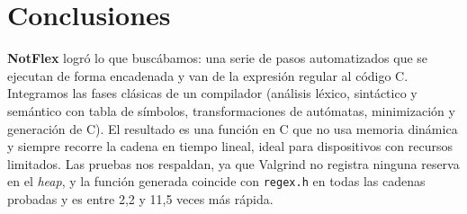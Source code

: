 \documentclass[runningheads]{llncs}
\begin{document}
\section{Conclusiones}
\textbf{NotFlex} logró lo que buscábamos: una serie de pasos automatizados que se ejecutan de forma encadenada y van de la expresión regular al código C. Integramos las fases clásicas de un compilador (análisis léxico, sintáctico y semántico con tabla de símbolos, transformaciones de autómatas, minimización y generación de C). El resultado es una función en C que no usa memoria dinámica y siempre recorre la cadena en tiempo lineal, ideal para dispositivos con recursos limitados. Las pruebas nos respaldan, ya que Valgrind no registra ninguna reserva en el \emph{heap}, y la función generada coincide con \texttt{regex.h} en todas las cadenas probadas y es entre 2,2 y 11,5 veces más rápida.

\end{document}

